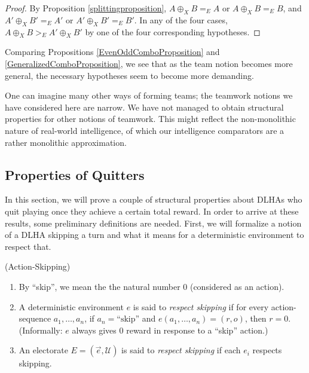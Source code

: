 \documentclass[twoside,11pt]{article}
\begin{document}
\begin{proof}
    By Proposition \ref{splittingproposition},
    $A\oplus_X B =_{E}A$ or $A\oplus_X B =_{E}B$,
    and $A'\oplus_X B' =_{E}A'$ or $A'\oplus_X B' =_{E}B'$.
    In any of the four cases, $A\oplus_X B >_{E} A'\oplus_X B'$
    by one of the four corresponding hypotheses.
\end{proof}

Comparing Propositions \ref{EvenOddComboProposition} and \ref{GeneralizedComboProposition},
we see that as the team notion becomes more general, the necessary hypotheses
seem to become more demanding.

One can imagine many other ways of forming teams; the teamwork notions we have considered
here are narrow. We have not managed to obtain structural properties for other
notions of teamwork. This might reflect the non-monolithic nature of real-world
intelligence, of which our intelligence comparators are a rather monolithic approximation.

\subsection{Properties of Quitters}
\label{quittersSubSection}

In this section, we will prove a couple of structural properties about
DLHAs who quit playing once they achieve a certain total reward. In order to
arrive at these results, some preliminary definitions are needed.
First, we will formalize a notion of a DLHA skipping a turn and what
it means for a deterministic environment to respect that.

\begin{definition}
    (Action-Skipping)
    \begin{enumerate}
        \item
            By ``skip'', we mean the the natural number $0$ (considered as an action).
        \item
            A deterministic environment $e$ is said to \emph{respect skipping} if
            for every action-sequence $a_1,\ldots,a_n$, if $a_n=\mbox{``skip''}$
            and $e(a_1,\ldots,a_n)=(r,o)$, then $r=0$.
            (Informally: $e$ always gives $0$ reward in response to a ``skip''
            action.)
        \item
            An electorate $E=(\vec{e},\mathscr U)$ is said to \emph{respect skipping}
            if each $e_i$ respects skipping.
    \end{enumerate}
\end{definition}
\end{document}
